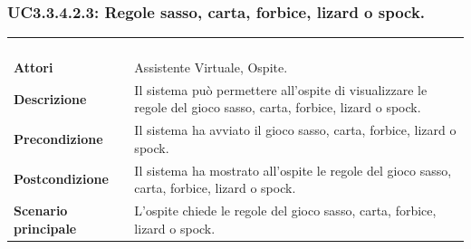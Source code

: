 \subsubsection{UC3.3.4.2.3: Regole sasso, carta, forbice, lizard o spock.}
\label{UC3.3.4.2.3}
\begin{longtable}{l|p{10cm}}
	\rowcolor[gray]{0.8} \multicolumn{2}{c}{} \\
	\rowcolor[gray]{0.8} \multicolumn{2}{c}{\textbf{UC3.3.4.2.3 - Regole sasso, carta, forbice, lizard o spock.}} \\
	\rowcolor[gray]{0.8} \multicolumn{2}{c}{} \\
	\hline
	&\\
	\textbf{Attori} & Assistente Virtuale, Ospite.\\[7pt]
	\textbf{Descrizione} & Il sistema può permettere all'ospite di visualizzare le regole del gioco sasso, carta, forbice, lizard o spock.\\[7pt]
	\textbf{Precondizione} & Il sistema ha avviato il gioco sasso, carta, forbice, lizard o spock.\\[7pt]
	\textbf{Postcondizione} & Il sistema ha mostrato all'ospite le regole del gioco sasso, carta, forbice, lizard o spock.\\[7pt]
	\textbf{Scenario principale} &L'ospite chiede le regole del gioco sasso, carta, forbice, lizard o spock.\\[7pt]\hline
\end{longtable}

